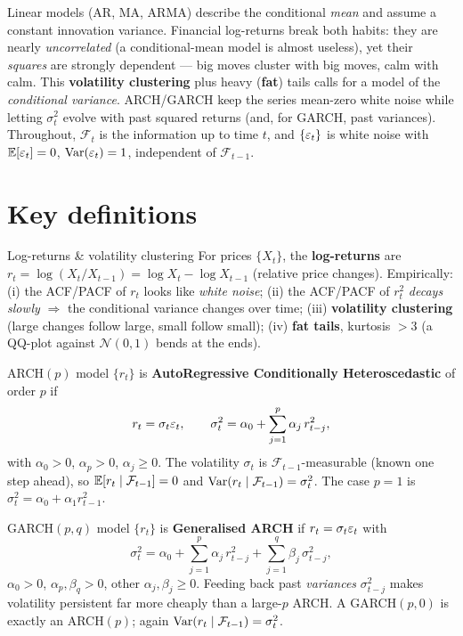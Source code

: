 \documentclass[11pt]{article}
\begin{document}

Linear models (AR, MA, ARMA) describe the conditional \emph{mean} and assume a constant innovation
variance. Financial log-returns break both habits: they are nearly \emph{uncorrelated} (a
conditional-mean model is almost useless), yet their \emph{squares} are strongly dependent --- big
moves cluster with big moves, calm with calm. This \textbf{volatility clustering} plus heavy
(\textbf{fat}) tails calls for a model of the \emph{conditional variance}. ARCH/GARCH keep the
series mean-zero white noise while letting $\sigma_t^2$ evolve with past squared returns (and, for
GARCH, past variances). Throughout, $\mathcal F_t$ is the information up to time $t$, and
$\{\varepsilon_t\}$ is white noise with $\mathbb{E}[\varepsilon_t]=0$, $\operatorname{Var}(\varepsilon_t)=1$, independent of $\mathcal F_{t-1}$.

\section*{Key definitions}

\begin{defn}{Log-returns \& volatility clustering}
For prices $\{X_t\}$, the \textbf{log-returns} are $r_t=\log(X_t/X_{t-1})=\log X_t-\log X_{t-1}$
(relative price changes). Empirically: (i) the ACF/PACF of $r_t$ looks like \emph{white noise};
(ii) the ACF/PACF of $r_t^2$ \emph{decays slowly} $\Rightarrow$ the conditional variance changes
over time; (iii) \textbf{volatility clustering} (large changes follow large, small follow small);
(iv) \textbf{fat tails}, kurtosis $>3$ (a QQ-plot against $\mathcal N(0,1)$ bends at the ends).
\end{defn}

\begin{defn}{ARCH$(p)$ model}
$\{r_t\}$ is \textbf{AutoRegressive Conditionally Heteroscedastic} of order $p$ if
\[
r_t=\sigma_t\varepsilon_t,\qquad
\sigma_t^2=\alpha_0+\sum_{j=1}^{p}\alpha_j\,r_{t-j}^2,
\]
with $\alpha_0>0$, $\alpha_p>0$, $\alpha_j\ge0$. The volatility $\sigma_t$ is
$\mathcal F_{t-1}$-measurable (known one step ahead), so
$\mathbb{E}[r_t\mid\mathcal F_{t-1}]=0$ and $\operatorname{Var}(r_t\mid\mathcal F_{t-1})=\sigma_t^2$. The case $p=1$ is
$\sigma_t^2=\alpha_0+\alpha_1 r_{t-1}^2$.
\end{defn}

\begin{defn}{GARCH$(p,q)$ model}
$\{r_t\}$ is \textbf{Generalised ARCH} if $r_t=\sigma_t\varepsilon_t$ with
\[
\sigma_t^2=\alpha_0+\sum_{j=1}^{p}\alpha_j\,r_{t-j}^2+\sum_{j=1}^{q}\beta_j\,\sigma_{t-j}^2,
\]
$\alpha_0>0$, $\alpha_p,\beta_q>0$, other $\alpha_j,\beta_j\ge0$. Feeding back past
\emph{variances} $\sigma_{t-j}^2$ makes volatility persistent far more cheaply than a large-$p$
ARCH. A GARCH$(p,0)$ is exactly an ARCH$(p)$; again $\operatorname{Var}(r_t\mid\mathcal F_{t-1})=\sigma_t^2$.
\end{defn}
\end{document}
